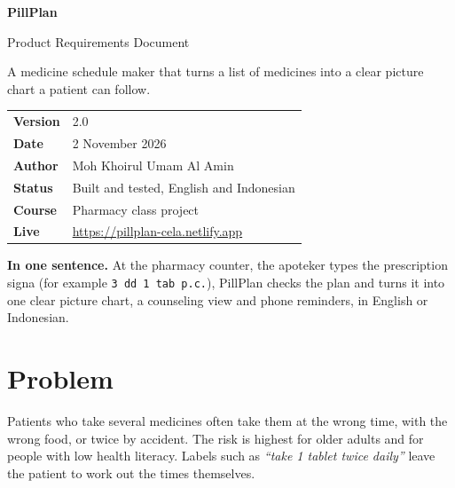 \documentclass[11pt]{article}
\begin{document}
\thispagestyle{empty}
\vspace*{8mm}
{\fontsize{34}{38}\selectfont\bfseries PillPlan}\par
\vspace{2mm}
{\Large Product Requirements Document}\par
\vspace{4mm}
{\color{inkmuted}A medicine schedule maker that turns a list of medicines into a clear picture chart a patient can follow.}\par
\vspace{6mm}
\begin{tabular}{@{}ll@{}}
\textbf{Version} & 2.0 \\
\textbf{Date} & 2 November 2026 \\
\textbf{Author} & Moh Khoirul Umam Al Amin \\
\textbf{Status} & Built and tested, English and Indonesian \\
\textbf{Course} & Pharmacy class project \\
\textbf{Live} & \url{https://pillplan-cela.netlify.app} \\
\end{tabular}
\vspace{6mm}

\begin{note}
\textbf{In one sentence.} At the pharmacy counter, the apoteker types the prescription signa (for example \texttt{3 dd 1 tab p.c.}), PillPlan checks the plan and turns it into one clear picture chart, a counseling view and phone reminders, in English or Indonesian.
\end{note}

\tableofcontents
\newpage

\section{Problem}
Patients who take several medicines often take them at the wrong time, with the wrong food, or twice by accident. The risk is highest for older adults and for people with low health literacy. Labels such as \emph{``take 1 tablet twice daily''} leave the patient to work out the times themselves.
\end{document}
